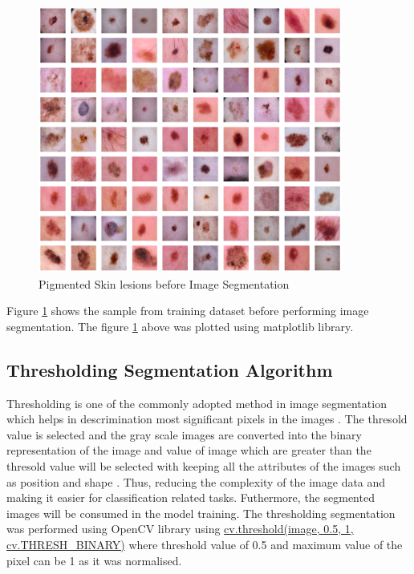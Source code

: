 \begin{figure}[!htb]
	\centering
	\includegraphics[width=10cm]{Images/bseg.png}
	\caption{Pigmented Skin lesions before Image Segmentation}
	\label{fig:before_seg}
\end{figure}

Figure \ref{fig:before_seg} shows the sample from training dataset before performing image segmentation.
The figure \ref{fig:before_seg} above was plotted using matplotlib library.


\subsection{Thresholding Segmentation Algorithm}
Thresholding is one of the commonly adopted method in image segmentation which helps in descrimination most 
significant pixels in the images \citep{al2010image}. The thresold value is selected and the gray scale images  
are converted into the binary representation of the image and value of image which are greater than the thresold
value will be selected with keeping all the attributes of the images such as position and shape \citep{al2010image}. 
Thus, reducing the complexity of the image data and making it easier for classification related tasks. Futhermore, the 
segmented images will be consumed in the model training. The thresholding segmentation was performed using OpenCV library using 
\url{cv.threshold(image, 0.5, 1, cv.THRESH_BINARY)} where threshold value of 0.5 and maximum value of the pixel can be 1
as it was normalised.

